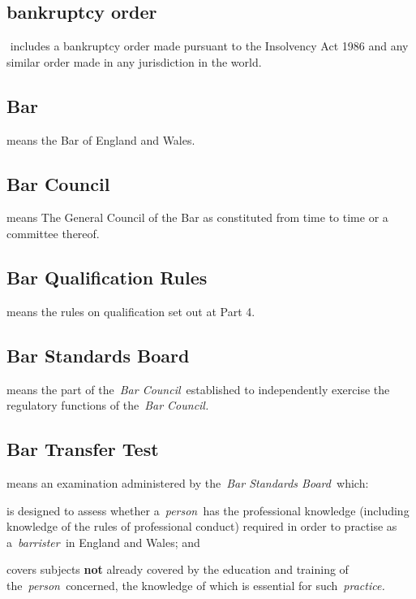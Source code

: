    \subsection{bankruptcy order } includes a bankruptcy order made pursuant
  to the Insolvency Act 1986 and any similar order made in any
  jurisdiction in the world.
  \subsection{Bar } means the Bar of England and Wales.  \subsection{Bar Council } means The General Council of the Bar as
  constituted from time to time or a committee thereof.  \subsection{Bar Qualification Rules } means the rules on qualification
  set out at Part 4.  \subsection{Bar Standards Board } means the part of the~\emph{Bar
  Council}~established to independently exercise the regulatory
  functions of the~\emph{Bar Council.} \subsection{Bar Transfer Test } means an examination administered by
  the~\emph{Bar Standards Board~}which:
  \al \item is designed to assess
  whether a~\emph{person~}has the professional knowledge (including
  knowledge of the rules of professional conduct) required in order to
  practise as a~\emph{barrister~}in England and Wales; and
\item covers
  subjects \textbf{not} already covered by the education and training of
  the~\emph{person~}concerned, the knowledge of which is essential for
  such~\emph{practice.} \la
  
